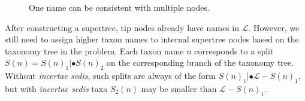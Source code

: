 \documentclass[english]{article}
\begin{document}
\begin{figure}
\hfill{}
\hfill{}
\hfill{}
\caption{\label{fig:One-name-can}One name can be consistent with multiple nodes.}
\end{figure}

After constructing a supertree, tip nodes already have names in \emph{$\mathcal{L}$}.
However, we still need to assign higher taxon names to internal supertree nodes
based on the taxonomy tree in the problem. Each taxon name $n$ corresponds to a
split $S(n)=S(n)_{1}|\bullet S(n)_{2}$ on the corresponding branch of the taxonomy tree. Without
\emph{incertae sedis}, such splits are always of the form $S(n)_{1}|\bullet\mathcal{L}-S(n)_{1}$, but
with \emph{incertae sedis} taxa $S_{2}(n)$ may be smaller than $\mathcal{L}-S(n)_{1}$.
\end{document}
